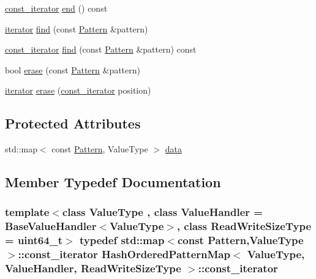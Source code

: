 \begin{DoxyCompactItemize}
\item 
\hyperlink{classHashOrderedPatternMap_a0162fc35654440e11ea66e71e8ffe8f8}{const\+\_\+iterator} \hyperlink{classHashOrderedPatternMap_a0aa676a59fa89d30a0c477c193d7ceec}{end} () const 
\item 
\hyperlink{classHashOrderedPatternMap_a149481ae49379713dae0ffcaff294f65}{iterator} \hyperlink{classHashOrderedPatternMap_ab0391b67630d9c20ee0069f7197ca9da}{find} (const \hyperlink{classPattern}{Pattern} \&pattern)
\item 
\hyperlink{classHashOrderedPatternMap_a0162fc35654440e11ea66e71e8ffe8f8}{const\+\_\+iterator} \hyperlink{classHashOrderedPatternMap_aa3894103fb86543ab242d0da072afb56}{find} (const \hyperlink{classPattern}{Pattern} \&pattern) const 
\item 
bool \hyperlink{classHashOrderedPatternMap_acc3231c8b727c982ef11c80d3390f8ec}{erase} (const \hyperlink{classPattern}{Pattern} \&pattern)
\item 
\hyperlink{classHashOrderedPatternMap_a149481ae49379713dae0ffcaff294f65}{iterator} \hyperlink{classHashOrderedPatternMap_a3c9a41c27310278a2d2f02cc7016ebae}{erase} (\hyperlink{classHashOrderedPatternMap_a0162fc35654440e11ea66e71e8ffe8f8}{const\+\_\+iterator} position)
\end{DoxyCompactItemize}
\subsection*{Protected Attributes}
\begin{DoxyCompactItemize}
\item 
std\+::map$<$ const \hyperlink{classPattern}{Pattern}, Value\+Type $>$ \hyperlink{classHashOrderedPatternMap_adb4b3e32e897537d7bb1f5deaa650b7a}{data}
\end{DoxyCompactItemize}


\subsection{Member Typedef Documentation}
\hypertarget{classHashOrderedPatternMap_a0162fc35654440e11ea66e71e8ffe8f8}{}
\subsubsection[{const\+\_\+iterator}]{\setlength{\rightskip}{0pt plus 5cm}template$<$class Value\+Type , class Value\+Handler  = Base\+Value\+Handler$<$\+Value\+Type$>$, class Read\+Write\+Size\+Type  = uint64\+\_\+t$>$ typedef std\+::map$<$const {\bf Pattern},Value\+Type$>$\+::{\bf const\+\_\+iterator} {\bf Hash\+Ordered\+Pattern\+Map}$<$ Value\+Type, Value\+Handler, Read\+Write\+Size\+Type $>$\+::{\bf const\+\_\+iterator}}\label{classHashOrderedPatternMap_a0162fc35654440e11ea66e71e8ffe8f8}
\hypertarget{classHashOrderedPatternMap_a149481ae49379713dae0ffcaff294f65}{}
